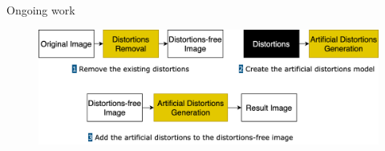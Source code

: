 \documentclass{libs/ufc_format}
\begin{document}
\begin{frame}{Ongoing work}



    \begin{figure}
        \includegraphics[scale=0.22]{libs/workoverview.png}
    \end{figure}
\end{frame}
\end{document}
